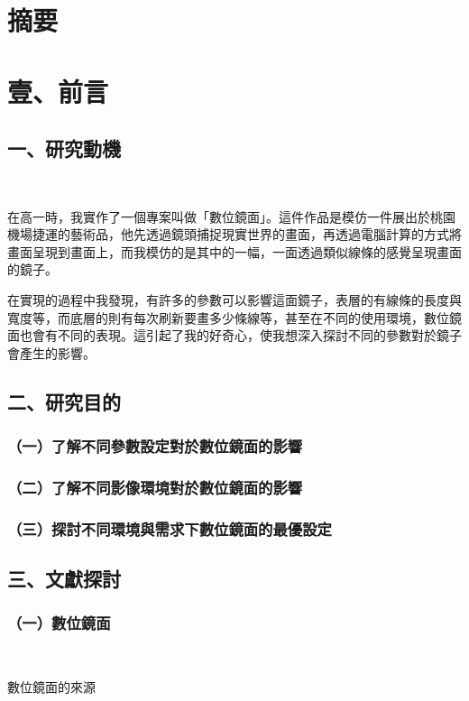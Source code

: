 \documentclass[12pt]{article}
\begin{document}
\section{摘要}

\newpage
\section{壹、前言}

\subsection{一、研究動機}
\

在高一時，我實作了一個專案叫做「數位鏡面」。這件作品是模仿一件展出於桃園機場捷運的藝術品，他先透過鏡頭捕捉現實世界的畫面，再透過電腦計算的方式將畫面呈現到畫面上，而我模仿的是其中的一幅，一面透過類似線條的感覺呈現畫面的鏡子。

在實現的過程中我發現，有許多的參數可以影響這面鏡子，表層的有線條的長度與寬度等，而底層的則有每次刷新要畫多少條線等，甚至在不同的使用環境，數位鏡面也會有不同的表現。這引起了我的好奇心，使我想深入探討不同的參數對於鏡子會產生的影響。

\subsection{二、研究目的}

\subsubsection{（一）了解不同參數設定對於數位鏡面的影響}
\subsubsection{（二）了解不同影像環境對於數位鏡面的影響}
\subsubsection{（三）探討不同環境與需求下數位鏡面的最優設定}

\subsection{三、文獻探討}

\subsubsection{（一）數位鏡面}
\

數位鏡面的來源
\end{document}
